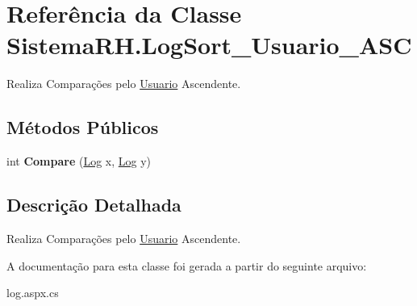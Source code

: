 \hypertarget{class_sistema_r_h_1_1_log_sort___usuario___a_s_c}{
\section{Referência da Classe SistemaRH.LogSort\_\-Usuario\_\-ASC}
\label{class_sistema_r_h_1_1_log_sort___usuario___a_s_c}
}


Realiza Comparações pelo \hyperlink{class_sistema_r_h_1_1_usuario}{Usuario} Ascendente.  


\subsection*{Métodos Públicos}
\begin{DoxyCompactItemize}
\item 
\hypertarget{class_sistema_r_h_1_1_log_sort___usuario___a_s_c_a6d0b6750c5dfb1534b6aa6f7f4eda30c}{
int {\bfseries Compare} (\hyperlink{class_sistema_r_h_1_1_log}{Log} x, \hyperlink{class_sistema_r_h_1_1_log}{Log} y)}
\label{class_sistema_r_h_1_1_log_sort___usuario___a_s_c_a6d0b6750c5dfb1534b6aa6f7f4eda30c}

\end{DoxyCompactItemize}


\subsection{Descrição Detalhada}
Realiza Comparações pelo \hyperlink{class_sistema_r_h_1_1_usuario}{Usuario} Ascendente. 

A documentação para esta classe foi gerada a partir do seguinte arquivo:\begin{DoxyCompactItemize}
\item 
log.aspx.cs\end{DoxyCompactItemize}
